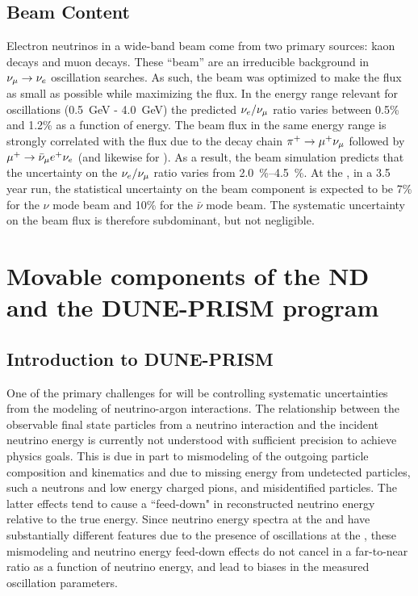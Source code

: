 \subsection{Beam \nue Content}
\label{ssec:beam-nue}
Electron neutrinos in a wide-band beam come from two primary sources: kaon decays and muon decays. These ``beam'' \nue are an irreducible background in $\nu_\mu \to \nu_e$ oscillation searches. As such, the  beam was optimized to make the \nue flux as small as possible while maximizing the \numu flux. In the energy range relevant for oscillations (\SI{0.5}{GeV} - \SI{4.0}{GeV}) the predicted $\nu_e/\nu_\mu$ ratio varies between 0.5\% and 1.2\% as a function of energy. The beam \nue flux in the same energy range is strongly correlated with the \numu flux due to the decay chain $\pi^+\to\mu^+\nu_\mu$ followed by $\mu^+ \to \bar\nu_\mu{} e^+ \nu_e $ (and likewise for \anue). As a result, the   beam simulation predicts that the uncertainty on the $\nu_e/\nu_\mu$ ratio varies from \SIrange{2.0}{4.5}{\%}. At the  , in a 3.5 year run, the statistical uncertainty on the beam \nue component is expected to be 7\% for the $\nu$ mode beam and 10\% for the $\bar{\nu}$ mode beam. The systematic uncertainty on the beam \nue flux is therefore subdominant, but not negligible.  





\section{Movable components of the ND and the DUNE-PRISM program}
\label{sec:appx-nd:nd-movable}

\subsection{Introduction to DUNE-PRISM}

One of the primary challenges for  will be controlling systematic uncertainties from the modeling of neutrino-argon interactions. The relationship between the observable final state particles from a neutrino interaction and the incident neutrino energy is currently not understood with sufficient precision to achieve  physics goals.  This is due in part to mismodeling of the outgoing particle composition and kinematics and due to missing energy from undetected particles, such a neutrons and low energy charged pions, and misidentified particles. The latter effects tend to cause  a ``feed-down" in reconstructed neutrino energy relative to the true energy. Since neutrino energy spectra at the  and  have substantially different features due to the presence of oscillations at the  , these mismodeling and neutrino energy feed-down effects do not cancel in a far-to-near ratio as a function of neutrino energy, and lead to biases in the measured oscillation parameters.


